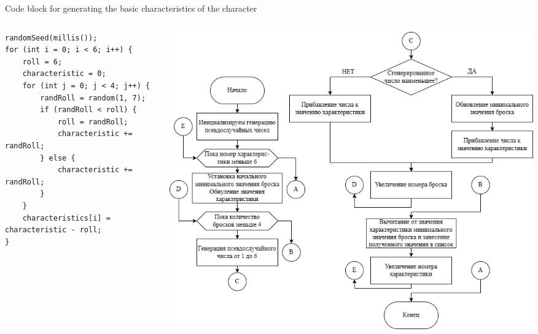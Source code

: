 \documentclass[12pt,a4paper,mathserif]{beamer}
\begin{document}
\begin{frame}[fragile]{{\small Code block for generating the basic characteristics of the character}}
\begin{columns}
\begin{column}{0.35\textwidth}
\tiny
\begin{verbatim}
randomSeed(millis());
for (int i = 0; i < 6; i++) {
    roll = 6;
    characteristic = 0;
    for (int j = 0; j < 4; j++) {
        randRoll = random(1, 7);
        if (randRoll < roll) {
            roll = randRoll;
            characteristic += randRoll;
        } else {
            characteristic += randRoll;
        }
    }
    characteristics[i] = characteristic - roll;
}
\end{verbatim}
\end{column}
\begin{column}{0.65\textwidth}
    \begin{center}
     \includegraphics[width=\textwidth]{generate_character.png}
     \end{center}
\end{column}
\end{columns}
\end{frame}
\end{document}
